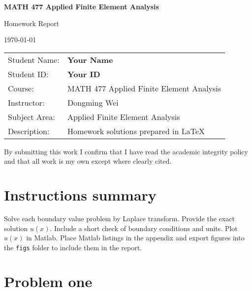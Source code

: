 \documentclass[12pt,a4paper]{article}
\begin{document}
\begin{titlepage}
  \centering

  {\Large\bfseries MATH 477 Applied Finite Element Analysis\par}
  \vspace{12pt}
  {\large Homework Report\par}
  \vspace{12pt}
  {\large \today\par}
  \vspace{12pt}


  \vfill

  \begin{tabularx}{\textwidth}{@{}lX@{}}
    Student Name: & \textbf{Your Name} \\
    Student ID:   & \textbf{Your ID} \\
    Course:       & MATH 477 Applied Finite Element Analysis \\
    Instructor:   & Dongming Wei \\
    Subject Area: & Applied Finite Element Analysis \\
    Description:  & Homework solutions prepared in \LaTeX
  \end{tabularx}

  \vfill
  {\footnotesize By submitting this work I confirm that I have read the academic integrity policy and that all work is my own except where clearly cited.\par}
\end{titlepage}

\tableofcontents
\newpage

\section{Instructions summary}
Solve each boundary value problem by Laplace transform. Provide the exact solution \(u(x)\). Include a short check of boundary conditions and units. Plot \(u(x)\) in Matlab. Place Matlab listings in the appendix and export figures into the \texttt{figs} folder to include them in the report.

\section{Problem one}
\end{document}
